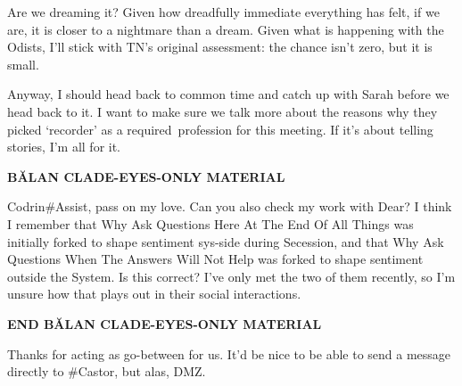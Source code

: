 Are we dreaming it? Given how dreadfully immediate everything has felt, if we are, it is closer to a nightmare than a dream. Given what is happening with the Odists, I'll stick with TN's original assessment: the chance isn't zero, but it is small.

Anyway, I should head back to common time and catch up with Sarah before we head back to it. I want to make sure we talk more about the reasons why they picked `recorder' as a required\pagebreak~profession for this meeting. If it's about telling stories, I'm all for it.

\begin{center}
\textbf{BĂLAN CLADE-EYES-ONLY MATERIAL}
\end{center}

\indent Codrin\#Assist, pass on my love. Can you also check my work with Dear? I think I remember that Why Ask Questions Here At The End Of All Things was initially forked to shape sentiment sys-side during Secession, and that Why Ask Questions When The Answers Will Not Help was forked to shape sentiment outside the System. Is this correct? I've only met the two of them recently, so I'm unsure how that plays out in their social interactions.

\begin{center}
\textbf{END BĂLAN CLADE-EYES-ONLY MATERIAL}
\end{center}

Thanks for acting as go-between for us. It'd be nice to be able to send a message directly to \#Castor, but alas, DMZ.
